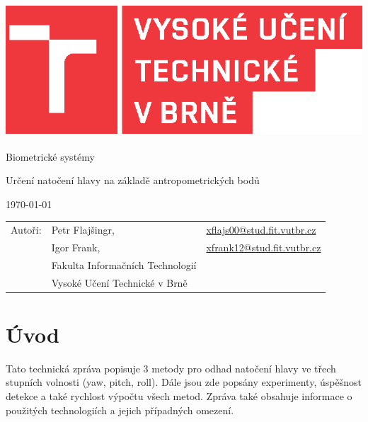 \documentclass[12pt,a4paper,titlepage,final]{report}
\makeatletter
\newcommand\Course{Biometrické systémy}
\newcommand\WorkTitle{Určení natočení hlavy na základě antropometrických bodů}
\newcommand\AuthorA{Petr Flajšingr}
\newcommand\AuthorAEmail{xflajs00@stud.fit.vutbr.cz}
\newcommand\AuthorB{Igor Frank}
\newcommand\AuthorBEmail{xfrank12@stud.fit.vutbr.cz}
\newcommand\Faculty{Fakulta Informačních Technologií}
\newcommand\School{Vysoké Učení Technické v Brně}
\makeatother
\begin{document}
	\begin{titlepage}
	\begin{center}
		\includegraphics[height=5cm]{images/logo.eps}
	\end{center}
	\vfill
	\begin{center}
		\begin{Large}
			\Course\\
		\end{Large}
		\bigskip
		\begin{Huge}
			\WorkTitle\\
		\end{Huge}
	\end{center}
	\vfill
	\begin{center}
		\begin{large}
			\today
		\end{large}
	\end{center}
	\vfill
	\begin{flushleft}
		\begin{large}
			\begin{tabular}{lll}
				Autoři: & \AuthorA, & \url{\AuthorAEmail} \\
				& \AuthorB, & \url{\AuthorBEmail} \\
				& \Faculty \\
				& \School \\
			\end{tabular}
		\end{large}
	\end{flushleft}
\end{titlepage}		

\section{Úvod}
Tato technická zpráva popisuje 3 metody pro odhad natočení hlavy ve třech stupních volnosti (yaw, pitch, roll). Dále jsou zde popsány experimenty, úspěšnost detekce a také rychlost výpočtu všech metod. Zpráva také obsahuje informace o použitých technologiích a jejich případných omezení.
\end{document}
